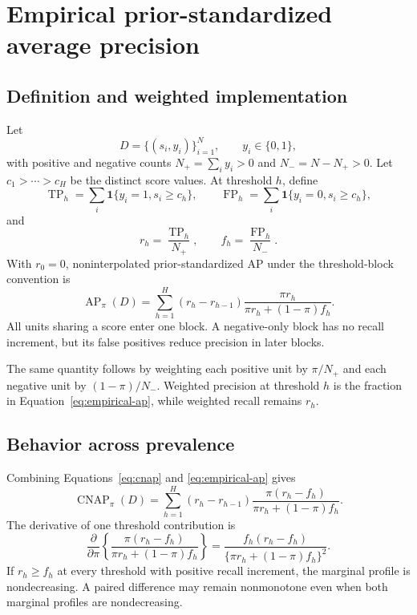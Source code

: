\documentclass[11pt]{article}
\newcommand{\AP}{\operatorname{AP}}
\newcommand{\CNAP}{\operatorname{CNAP}}
\theoremstyle{remark}
\begin{document}
\clearpage

\appendix

\section{Empirical prior-standardized average precision}
\label{app:ap}

\subsection{Definition and weighted implementation}

Let
\[
D=\{(s_i,y_i)\}_{i=1}^N,
\qquad y_i\in\{0,1\},
\]
with positive and negative counts $N_+=\sum_i y_i>0$ and
$N_-=N-N_+>0$. Let $c_1>\cdots>c_H$ be the distinct score values. At
threshold $h$, define
\[
\operatorname{TP}_h
=\sum_i\mathbf 1\{y_i=1,s_i\geq c_h\},
\qquad
\operatorname{FP}_h
=\sum_i\mathbf 1\{y_i=0,s_i\geq c_h\},
\]
and
\[
r_h=\frac{\operatorname{TP}_h}{N_+},
\qquad
f_h=\frac{\operatorname{FP}_h}{N_-}.
\]
With $r_0=0$, noninterpolated prior-standardized AP under the threshold-block
convention is
\begin{equation}
\AP_\pi(D)
=
\sum_{h=1}^H
(r_h-r_{h-1})
\frac{\pi r_h}{\pi r_h+(1-\pi)f_h}.
\label{eq:empirical-ap}
\end{equation}
All units sharing a score enter one block. A negative-only block has no recall
increment, but its false positives reduce precision in later blocks.

The same quantity follows by weighting each positive unit by $\pi/N_+$ and
each negative unit by $(1-\pi)/N_-$. Weighted precision at threshold $h$ is
the fraction in Equation~\eqref{eq:empirical-ap}, while weighted recall remains
$r_h$.

\subsection{Behavior across prevalence}

Combining Equations~\eqref{eq:cnap} and \eqref{eq:empirical-ap} gives
\begin{equation}
\CNAP_\pi(D)
=
\sum_{h=1}^H
(r_h-r_{h-1})
\frac{\pi(r_h-f_h)}
{\pi r_h+(1-\pi)f_h}.
\label{eq:cnap-profile}
\end{equation}
The derivative of one threshold contribution is
\begin{equation}
\frac{\partial}{\partial\pi}
\left\{
\frac{\pi(r_h-f_h)}
{\pi r_h+(1-\pi)f_h}
\right\}
=
\frac{f_h(r_h-f_h)}
{\{\pi r_h+(1-\pi)f_h\}^2}.
\label{eq:cnap-derivative}
\end{equation}
If $r_h\geq f_h$ at every threshold with positive recall increment, the
marginal profile is nondecreasing. A paired difference may remain nonmonotone
even when both marginal profiles are nondecreasing.
\end{document}
